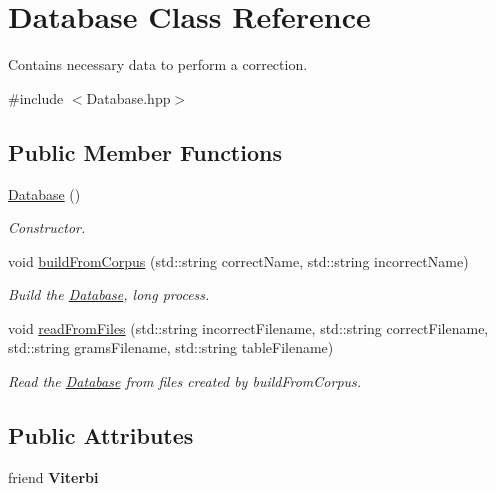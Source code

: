 \hypertarget{classDatabase}{}\section{Database Class Reference}
\label{classDatabase}


Contains necessary data to perform a correction.  




{\ttfamily \#include $<$Database.\+hpp$>$}

\subsection*{Public Member Functions}
\begin{DoxyCompactItemize}
\item 
\hyperlink{classDatabase_a4703c80e6969d33565ea340f768fdadf}{Database} ()
\begin{DoxyCompactList}\small\item\em Constructor. \end{DoxyCompactList}\item 
void \hyperlink{classDatabase_a98b7974dc1e1b76456fa35cc2665e6f9}{build\+From\+Corpus} (std\+::string correct\+Name, std\+::string incorrect\+Name)
\begin{DoxyCompactList}\small\item\em Build the \hyperlink{classDatabase}{Database}, long process. \end{DoxyCompactList}\item 
void \hyperlink{classDatabase_a3dbadcd3a09ae36cb36c73519e34b328}{read\+From\+Files} (std\+::string incorrect\+Filename, std\+::string correct\+Filename, std\+::string grams\+Filename, std\+::string table\+Filename)
\begin{DoxyCompactList}\small\item\em Read the \hyperlink{classDatabase}{Database} from files created by build\+From\+Corpus. \end{DoxyCompactList}\end{DoxyCompactItemize}
\subsection*{Public Attributes}
\begin{DoxyCompactItemize}
\item 
\mbox{\label{classDatabase_affb4d666b7bac4f76aca3863e158cf11}} 
friend {\bfseries Viterbi}
\end{DoxyCompactItemize}


